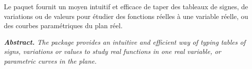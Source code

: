 \documentclass[12pt, a4paper]{article}
\begin{document}
\noindent
Le paquet  fournit un moyen intuitif et efficace de taper des tableaux de signes, de variations ou de valeurs pour étudier des fonctions réelles à une variable réelle, ou des courbes paramétriques du plan réel.




\tdocsep

{\noindent
\small\itshape
\textbf{Abstract.}
The  package provides an intuitive and efficient way of typing tables of signs, variations or values to study real functions in one real variable, or parametric curves in the plane.
}
\end{document}
